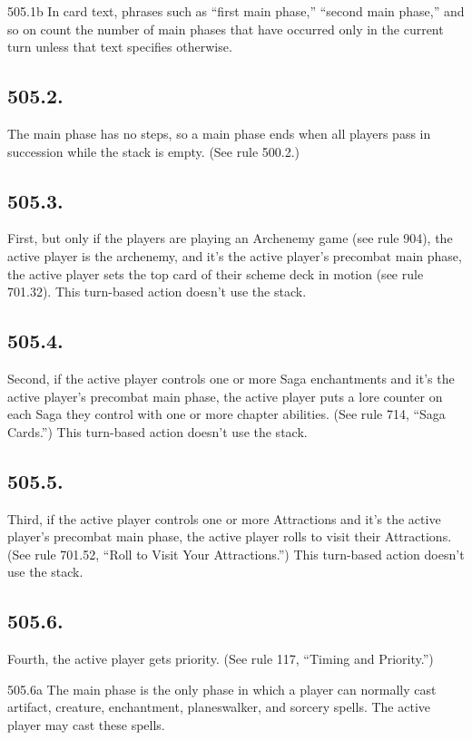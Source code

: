 505.1b In card text, phrases such as “first main phase,” “second main phase,” and so on count the number of main phases that have occurred only in the current turn unless that text specifies otherwise.

\subsection*{505.2.}
The main phase has no steps, so a main phase ends when all players pass in succession while the stack is empty. (See rule 500.2.)

\subsection*{505.3.}
First, but only if the players are playing an Archenemy game (see rule 904), the active player is the archenemy, and it’s the active player’s precombat main phase, the active player sets the top card of their scheme deck in motion (see rule 701.32). This turn-based action doesn’t use the stack.

\subsection*{505.4.}
Second, if the active player controls one or more Saga enchantments and it’s the active player’s precombat main phase, the active player puts a lore counter on each Saga they control with one or more chapter abilities. (See rule 714, “Saga Cards.”) This turn-based action doesn’t use the stack.

\subsection*{505.5.}
Third, if the active player controls one or more Attractions and it’s the active player’s precombat main phase, the active player rolls to visit their Attractions. (See rule 701.52, “Roll to Visit Your Attractions.”) This turn-based action doesn’t use the stack.

\subsection*{505.6.}
Fourth, the active player gets priority. (See rule 117, “Timing and Priority.”)

505.6a The main phase is the only phase in which a player can normally cast artifact, creature, enchantment, planeswalker, and sorcery spells. The active player may cast these spells.

